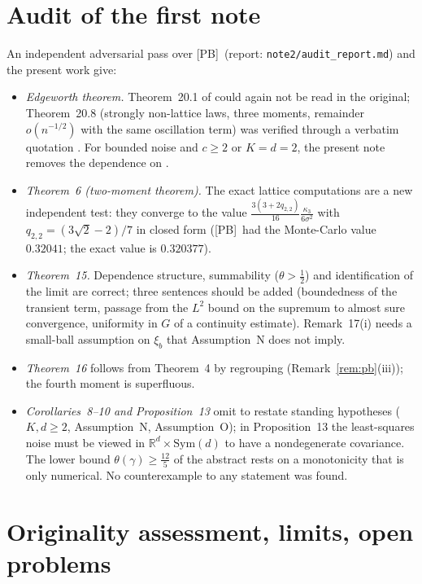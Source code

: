 \documentclass[10pt]{article}
\theoremstyle{definition}
\theoremstyle{remark}
\newcommand{\R}{\mathbb{R}}
\newcommand{\PB}{\textup{[PB]}}
\begin{document}
\section{Audit of the first note}\label{sec:audit}

An independent adversarial pass over \PB\ (report: \texttt{note2/audit\_report.md}) and the present work give:
\begin{itemize}[itemsep=1pt,topsep=2pt]
\item \emph{Edgeworth theorem.} Theorem~20.1 of \cite{br} could again not be read in the original; Theorem~20.8 (strongly
non-lattice laws, three moments, remainder $o(n^{-1/2})$ with the same oscillation term) was verified through a verbatim
quotation \cite{honda}. For bounded noise and $c\ge2$ or $K=d=2$, the present note removes the dependence on \cite{br}.
\item \emph{Theorem~6 (two-moment theorem).} The exact lattice computations are a new independent test: they converge
to the value $\frac{3(3+2q_{2,2})}{16}\frac{\kappa_3}{6\sigma^2}$ with $q_{2,2}=(3\sqrt2-2)/7$ in closed form (\PB\ had the
Monte-Carlo value $0.32041$; the exact value is $0.320377$).
\item \emph{Theorem~15.} Dependence structure, summability ($\theta>\frac12$) and identification of the limit are
correct; three sentences should be added (boundedness of the transient term, passage from the $L^2$ bound on the
supremum to almost sure convergence, uniformity in $G$ of a continuity estimate). Remark~17(i) needs a small-ball
assumption on $\xi_b$ that Assumption~N does not imply.
\item \emph{Theorem~16} follows from Theorem~4 by regrouping (Remark~\ref{rem:pb}(iii)); the fourth moment is superfluous.
\item \emph{Corollaries~8--10 and Proposition~13} omit to restate standing hypotheses ($K,d\ge2$, Assumption~N,
Assumption~O); in Proposition~13 the least-squares noise must be viewed in $\R^d\times\mathrm{Sym}(d)$ to have a
nondegenerate covariance. The lower bound $\theta(\gamma)\ge\frac{12}5$ of the abstract rests on a monotonicity that is
only numerical. No counterexample to any statement was found.
\end{itemize}

\section{Originality assessment, limits, open problems}\label{sec:ledger}
\end{document}
